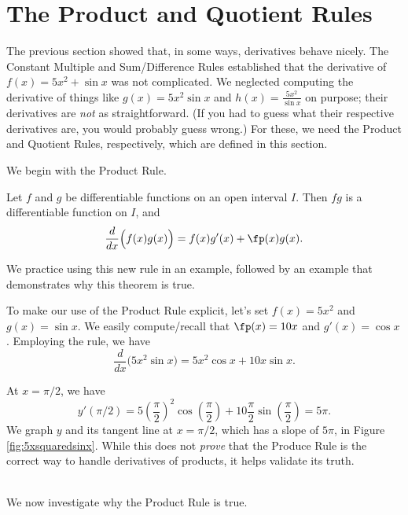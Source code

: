 \section{The Product and Quotient Rules}\label{sec:prod_quot_rules}

The previous section showed that, in some ways, derivatives behave nicely. The Constant Multiple and Sum/Difference Rules established that the derivative of $f(x) = 5x^2+\sin x $ was not complicated. We neglected computing the derivative of things like $g(x) = 5x^2\sin x$ and $h(x) = \frac{5x^2}{\sin x}$ on purpose; their derivatives are \textit{not} as straightforward. (If you had to guess what their respective derivatives are, you would probably guess wrong.) For these, we need the Product and Quotient Rules, respectively, which are defined in this section. 

We begin with the Product Rule.

{Let $f$ and $g$ be differentiable functions on an open interval $I$. Then $fg$ is a differentiable function on $I$, and $$\frac{d}{dx}\Big(f(x)g(x)\Big) = f(x)g'(x) + \fp(x)g(x).$$}

We practice using this new rule in an example, followed by an example that demonstrates why this theorem is true.\\

{To make our use of the Product Rule explicit, let's set $f(x) = 5x^2$ and $g(x) = \sin x$. We easily compute/recall that $\fp(x) = 10x$ and $g'(x) = \cos x$. Employing the rule, we have $$\frac{d}{dx}\Big(5x^2\sin x\Big) = 5x^2\cos x + 10x\sin x.$$

At $x=\pi/2$, we have $$y'(\pi/2) = 5\left(\frac{\pi}{2}\right)^2\cos \left(\frac{\pi}2\right) + 10\frac{\pi}2 \sin\left(\frac{\pi}{2}\right) = 5\pi.$$ We graph $y$ and its tangent line at $x=\pi/2$, which has a slope of $5\pi$, in Figure \ref{fig:5xsquaredsinx}. While this does not \textit{prove} that the Produce Rule is the correct way to handle derivatives of products, it helps validate its truth.
}\\

We now investigate why the Product Rule is true.\\

